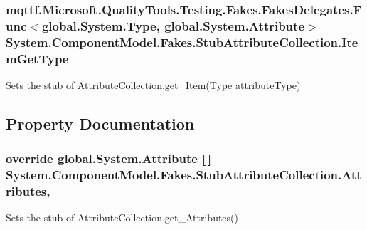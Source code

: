 \hypertarget{class_system_1_1_component_model_1_1_fakes_1_1_stub_attribute_collection_af7370b1eb09e88387f61a3721a208ae8}{
\subsubsection[{Item\-Get\-Type}]{\setlength{\rightskip}{0pt plus 5cm}mqttf.\-Microsoft.\-Quality\-Tools.\-Testing.\-Fakes.\-Fakes\-Delegates.\-Func$<$global.\-System.\-Type, global.\-System.\-Attribute$>$ System.\-Component\-Model.\-Fakes.\-Stub\-Attribute\-Collection.\-Item\-Get\-Type}}\label{class_system_1_1_component_model_1_1_fakes_1_1_stub_attribute_collection_af7370b1eb09e88387f61a3721a208ae8}


Sets the stub of Attribute\-Collection.\-get\-\_\-\-Item(\-Type attribute\-Type)



\subsection{Property Documentation}
\hypertarget{class_system_1_1_component_model_1_1_fakes_1_1_stub_attribute_collection_af930d3a75d88ed53e23788b0fdbaa637}{
\subsubsection[{Attributes}]{\setlength{\rightskip}{0pt plus 5cm}override global.\-System.\-Attribute \mbox{[}$\,$\mbox{]} System.\-Component\-Model.\-Fakes.\-Stub\-Attribute\-Collection.\-Attributes\hspace{0.3cm}{\ttfamily [get]}, {\ttfamily [protected]}}}\label{class_system_1_1_component_model_1_1_fakes_1_1_stub_attribute_collection_af930d3a75d88ed53e23788b0fdbaa637}


Sets the stub of Attribute\-Collection.\-get\-\_\-\-Attributes()


